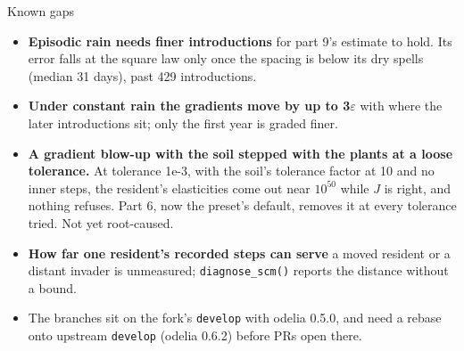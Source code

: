 \documentclass[aspectratio=169,10pt]{beamer}
\begin{document}
\begin{frame}{Known gaps}
  \small
  \begin{itemize}
    \item \textbf{Episodic rain needs finer introductions} for part 9's estimate to hold. Its error
      falls at the square law only once the spacing is below its dry spells (median 31 days),
      past 429 introductions.
    \item \textbf{Under constant rain the gradients move by up to 3$\varepsilon$} with where the
      later introductions sit; only the first year is graded finer.
    \item \textbf{A gradient blow-up with the soil stepped with the plants at a loose tolerance.}
      At tolerance 1e-3, with the soil's tolerance factor at 10 and no inner steps, the resident's
      elasticities come out near $10^{50}$ while $J$ is right, and nothing refuses. Part 6, now
      the preset's default, removes it at every tolerance tried. Not yet root-caused.
    \item \textbf{How far one resident's recorded steps can serve} a moved resident or a distant
      invader is unmeasured; \texttt{diagnose\_scm()} reports the distance without a bound.
    \item The branches sit on the fork's \texttt{develop} with odelia 0.5.0, and need a rebase
      onto upstream \texttt{develop} (odelia 0.6.2) before PRs open there.
  \end{itemize}
\end{frame}
\end{document}
